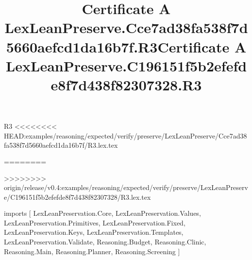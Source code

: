 \begin{lexlean}{R3}
<<<<<<<< HEAD:examples/reasoning/expected/verify/preserve/LexLeanPreserve/Cce7ad38fa538f7d5660aefcd1da16b7f/R3.lex.tex
\title{Certificate A LexLeanPreserve.Cce7ad38fa538f7d5660aefcd1da16b7f.R3}
========
\title{Certificate A LexLeanPreserve.C196151f5b2efefde8f7d438f82307328.R3}
>>>>>>>> origin/release/v0.4:examples/reasoning/expected/verify/preserve/LexLeanPreserve/C196151f5b2efefde8f7d438f82307328/R3.lex.tex
\begin{coremodule}
imports [
  LexLeanPreservation.Core,
  LexLeanPreservation.Values,
  LexLeanPreservation.Primitives,
  LexLeanPreservation.Fixed,
  LexLeanPreservation.Keys,
  LexLeanPreservation.Templates,
  LexLeanPreservation.Validate,
  Reasoning.Budget,
  Reasoning.Clinic,
  Reasoning.Main,
  Reasoning.Planner,
  Reasoning.Screening
]


\end{coremodule}
\end{lexlean}
